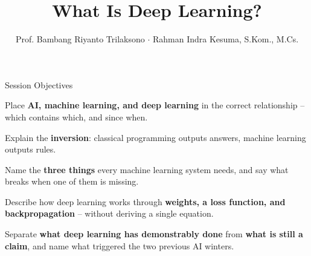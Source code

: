 \documentclass[aspectratio=169,11pt,t]{beamer}
\title{What Is Deep Learning?}
\author{Prof. Bambang Riyanto Trilaksono $\cdot$ Rahman Indra Kesuma, S.Kom., M.Cs.}
\date{}
\begin{document}
\covertitle

\begin{frame}[shrink=25]{Session Objectives}
\begin{isteps}
\item Place \textbf{AI, machine learning, and deep learning} in the correct relationship -- which contains which, and since when.
\item Explain the \textbf{inversion}: classical programming outputs answers, machine learning outputs rules.
\item Name the \textbf{three things} every machine learning system needs, and say what breaks when one of them is missing.
\item Describe how deep learning works through \textbf{weights, a loss function, and backpropagation} -- without deriving a single equation.
\item Separate \textbf{what deep learning has demonstrably done} from \textbf{what is still a claim}, and name what triggered the two previous AI winters.
\end{isteps}

\vskip 6pt
\vskip 4pt
\vskip 2pt
\end{frame}
\end{document}
